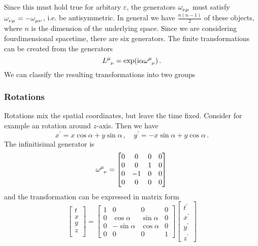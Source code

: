 Since this must hold true for arbitary $\varepsilon$, the generators
$\tensor{\omega}{_\nu_\mu}$ must satisfy
$\tensor{\omega}{_\nu_\mu}=-\tensor{\omega}{_\mu_\nu}$, i.e. be antisymmetric.
In general we have $\frac{n(n-1)}{2}$ of these objects, where $n$ is the
dimension of the underlying space.
Since we are considering fourdimensional spacetime, there are six generators.
The finite transformations can be created from the generators
\begin{equation}
    \tensor{L}{^\mu_\nu}=\exp\left(\imI\alpha\tensor{\omega}{^\mu_\nu}\right)\,.
\end{equation}
We can
classify the resulting transformations into two groups
\subsubsection{Rotations}
Rotations mix the spatial coordinates, but leave the time fixed. Consider for
example an rotation around $z$-axis. Then we have
\begin{equation}
    x^\prime=x\cos\alpha+y\sin\alpha \, ,\quad y^\prime=-x\sin\alpha+y\cos\alpha \, .
\end{equation}
The infinitisimal generator is
\begin{equation}
    \tensor{\omega}{^\mu_\nu}
    =
    \begin{bmatrix}
        0&0 & 0&0\\
        0&0 &1&0\\
        0&-1&0 &0\\
        0&0 &0 &0
    \end{bmatrix}\,
\end{equation}
and the transformation can be expressed in matrix form
\begin{equation}
    \begin{bmatrix}
        t\\
        x\\
        y\\
        z\\
    \end{bmatrix}=
    \begin{bmatrix}
        1&0 & 0&0\\
        0&\cos\alpha &\sin\alpha&0\\
        0&-\sin\alpha&\cos\alpha &0\\
        0&0 &0 &1
    \end{bmatrix}
    \begin{bmatrix}
        t^\prime\\
        x^\prime\\
        y^\prime\\
        z^\prime
    \end{bmatrix}
\end{equation}
